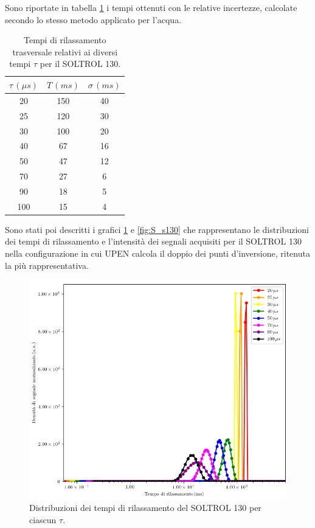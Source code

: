 Sono riportate in tabella \ref{tab:T_s130} i tempi ottenuti con le relative incertezze, calcolate secondo lo stesso metodo applicato per l'acqua.

\begin{table}[h!]
    \begin{center}
    \begin{tabular}{c c c}
    \toprule
    	${\tau}\,({\mu}s)$ & $T\,(ms)$ & ${\sigma}\,(ms)$ \\
    \midrule
	 20 & 150 & 40 \\
	 25 & 120 & 30 \\
	 30 & 100 & 20 \\
	 40 & 67 & 16 \\
	 50 & 47 & 12 \\
	 70 & 27 & 6 \\
	 90 & 18 & 5 \\
	 100 & 15 & 4 \\
    \bottomrule
    \end{tabular}
    \caption{Tempi di rilassamento trasversale relativi ai diversi tempi $\tau$ per il SOLTROL 130.}
    \label{tab:T_s130}
    \end{center}
\end{table}

Sono stati poi descritti i grafici \ref{fig:D_s130} e \ref{fig:S_s130} che rappresentano le distribuzioni dei tempi di rilassamento e l'intensità dei segnali acquisiti per il SOLTROL 130 nella configurazione in cui UPEN calcola il doppio dei punti d'inversione, ritenuta la più rappresentativa.

\begin{figure}[h!]
\centering
\includegraphics[scale=0.3]{Figure/SOLTROL130.png}
\caption{Distribuzioni dei tempi di rilassamento del SOLTROL 130 per ciascun $\tau$.}
\label{fig:D_s130}
\end{figure}

